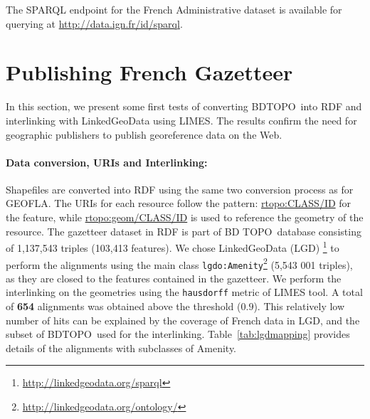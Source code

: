 \begin{itemize}
\begin{table}[!htbp]
\end{table}

The SPARQL endpoint for the French Administrative dataset is available for querying at \url{http://data.ign.fr/id/sparql}.


\section{Publishing  French Gazetteer} \label{sec:bdtopo}

In this section, we present some first tests of converting BDTOPO\circledR ~into RDF and interlinking with LinkedGeoData using LIMES. The results confirm the need for geographic publishers to publish georeference data on the Web. 

\paragraph{Data conversion, URIs and Interlinking:}
Shapefiles are converted into RDF using the same two conversion process as for GEOFLA\circledR. The URIs for each resource follow the pattern: \url{rtopo:CLASS/ID} for the feature, while  \url{rtopo:geom/CLASS/ID} is used to reference the geometry of the resource.
The gazetteer dataset in RDF is part of BD TOPO\circledR ~database consisting of  1,137,543 triples (103,413 features). We chose LinkedGeoData (LGD)
\footnote{\url{http://linkedgeodata.org/sparql}} to perform the alignments using the main class \texttt{lgdo:Amenity}\footnote{\url{http://linkedgeodata.org/ontology/}} (5,543 001 triples), as they are closed to the features contained in the gazetteer. We perform the interlinking on the geometries using the \texttt{hausdorff} metric of LIMES tool. A total of \textbf{654} alignments was obtained above the threshold ($0.9$). This relatively low number of hits can be explained by the coverage of French data in LGD, and the subset of BDTOPO\circledR  ~used for the interlinking. Table~\ref{tab:lgdmapping} provides details of the alignments with subclasses of Amenity.


\end{itemize}
